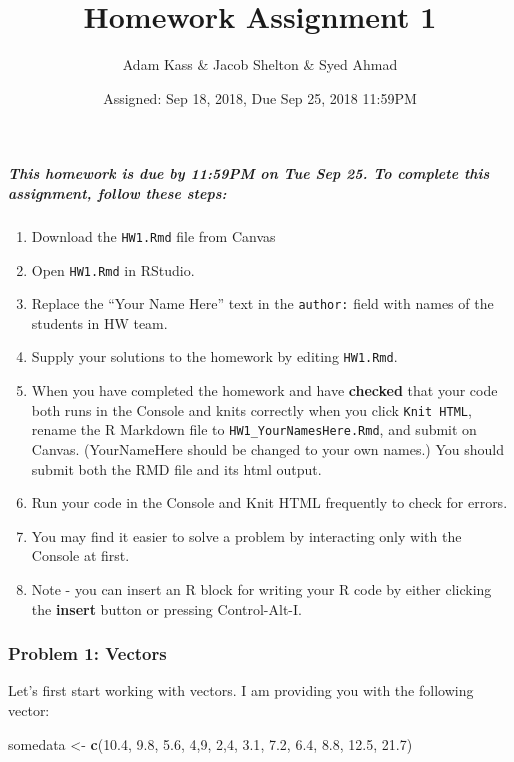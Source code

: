 \documentclass[]{article}
\title{Homework Assignment 1}
\author{Adam Kass \& Jacob Shelton \& Syed Ahmad}
\date{Assigned: Sep 18, 2018, Due Sep 25, 2018 11:59PM}
\newenvironment{Shaded}{\begin{snugshade}}{\end{snugshade}}
\newcommand{\KeywordTok}[1]{\textcolor[rgb]{0.13,0.29,0.53}{\textbf{#1}}}
\newcommand{\DecValTok}[1]{\textcolor[rgb]{0.00,0.00,0.81}{#1}}
\newcommand{\FloatTok}[1]{\textcolor[rgb]{0.00,0.00,0.81}{#1}}
\newcommand{\StringTok}[1]{\textcolor[rgb]{0.31,0.60,0.02}{#1}}
\newcommand{\NormalTok}[1]{#1}
\let\oldsubparagraph\subparagraph
\renewcommand{\subparagraph}[1]{\oldsubparagraph{#1}\mbox{}}
\begin{document}
\maketitle

\subparagraph{\texorpdfstring{This homework is due by \textbf{11:59PM on
Tue Sep 25}. To complete this assignment, follow these
steps:}{This homework is due by 11:59PM on Tue Sep 25. To complete this assignment, follow these steps:}}\label{this-homework-is-due-by-1159pm-on-tue-sep-25.-to-complete-this-assignment-follow-these-steps}

\begin{enumerate}
\def\labelenumi{\arabic{enumi}.}
\item
  Download the \texttt{HW1.Rmd} file from Canvas
\item
  Open \texttt{HW1.Rmd} in RStudio.
\item
  Replace the ``Your Name Here'' text in the \texttt{author:} field with
  names of the students in HW team.
\item
  Supply your solutions to the homework by editing \texttt{HW1.Rmd}.
\item
  When you have completed the homework and have \textbf{checked} that
  your code both runs in the Console and knits correctly when you click
  \texttt{Knit\ HTML}, rename the R Markdown file to
  \texttt{HW1\_YourNamesHere.Rmd}, and submit on Canvas. (YourNameHere
  should be changed to your own names.) You should submit both the RMD
  file and its html output.
\item
  Run your code in the Console and Knit HTML frequently to check for
  errors.
\item
  You may find it easier to solve a problem by interacting only with the
  Console at first.
\item
  Note - you can insert an R block for writing your R code by either
  clicking the \textbf{insert} button or pressing Control-Alt-I.
\end{enumerate}

\subsubsection{Problem 1: Vectors}\label{problem-1-vectors}

Let's first start working with vectors. I am providing you with the
following vector:

\begin{Shaded}
\begin{Highlighting}[]
\NormalTok{somedata <-}\StringTok{ }\KeywordTok{c}\NormalTok{(}\FloatTok{10.4}\NormalTok{, }\FloatTok{9.8}\NormalTok{, }\FloatTok{5.6}\NormalTok{, }\DecValTok{4}\NormalTok{,}\DecValTok{9}\NormalTok{, }\DecValTok{2}\NormalTok{,}\DecValTok{4}\NormalTok{, }\FloatTok{3.1}\NormalTok{, }\FloatTok{7.2}\NormalTok{, }\FloatTok{6.4}\NormalTok{, }\FloatTok{8.8}\NormalTok{, }\FloatTok{12.5}\NormalTok{, }\FloatTok{21.7}\NormalTok{)}
\end{Highlighting}
\end{Shaded}
\end{document}
